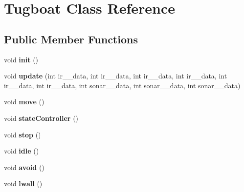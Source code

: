 \hypertarget{class_tugboat}{}\section{Tugboat Class Reference}
\label{class_tugboat}
\subsection*{Public Member Functions}
\begin{DoxyCompactItemize}
\item 
void {\bfseries init} ()\hypertarget{class_tugboat_ad1b27fc4ef5d493ef5ae63e592659d23}{}\label{class_tugboat_ad1b27fc4ef5d493ef5ae63e592659d23}

\item 
void {\bfseries update} (int ir\+\_\+\_\+data, int ir\+\_\+\_\+data, int ir\+\_\+\_\+data, int ir\+\_\+\_\+data, int ir\+\_\+\_\+data, int ir\+\_\+\_\+data, int sonar\+\_\+\_\+data, int sonar\+\_\+\_\+data, int sonar\+\_\+\_\+data)\hypertarget{class_tugboat_a9ab528ee3e455a8f1c065deee4d4d1ed}{}\label{class_tugboat_a9ab528ee3e455a8f1c065deee4d4d1ed}

\item 
void {\bfseries move} ()\hypertarget{class_tugboat_af1723d269679ea0c367f064efb7daf85}{}\label{class_tugboat_af1723d269679ea0c367f064efb7daf85}

\item 
void {\bfseries state\+Controller} ()\hypertarget{class_tugboat_a60c64f9ea72ddd7cb5795535bc21f2c8}{}\label{class_tugboat_a60c64f9ea72ddd7cb5795535bc21f2c8}

\item 
void {\bfseries stop} ()\hypertarget{class_tugboat_a5577971d573c50f5778afcfe540e4c39}{}\label{class_tugboat_a5577971d573c50f5778afcfe540e4c39}

\item 
void {\bfseries idle} ()\hypertarget{class_tugboat_af3dd52e42a51afe64ff6ecd2d4cccb17}{}\label{class_tugboat_af3dd52e42a51afe64ff6ecd2d4cccb17}

\item 
void {\bfseries avoid} ()\hypertarget{class_tugboat_a79c2d7daca788a868797f65b789f7a30}{}\label{class_tugboat_a79c2d7daca788a868797f65b789f7a30}

\item 
void {\bfseries lwall} ()\hypertarget{class_tugboat_a792d82496202f0dd8d4c2b6ce18416e3}{}\label{class_tugboat_a792d82496202f0dd8d4c2b6ce18416e3}


\end{DoxyCompactItemize}
